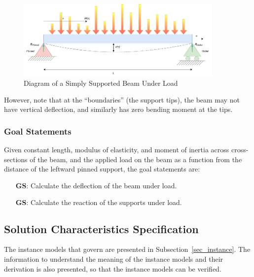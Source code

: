 \documentclass[12pt]{article}
\newcounter{goalnum} %
\begin{document}
\begin{figure}[H]
    \begin{center}
        \includegraphics[width=0.9\textwidth]{temp/beam_bending_diagram_annotated.drawio.png}
        \caption{\label{beam_bending_diagram_annotated} Diagram of a Simply Supported Beam Under Load}
    \end{center}
\end{figure}

However, note that at the ``boundaries'' (the support tips), the beam may not
have vertical deflection, and similarly has zero bending moment at the tips.

\subsubsection{Goal Statements}
\label{sssec_goals}

\noindent{}Given constant length, modulus of elasticity, and moment of inertia
across cross-sections of the beam, and the applied load on the beam as a
function from the distance of the leftward pinned support, the goal statements
are:

\begin{itemize}

    \item[\refstepcounter{goalnum}\textbf{GS\thegoalnum{}}\label{deflection}:]
        Calculate the deflection of the beam under load.

    \item[\refstepcounter{goalnum}\textbf{GS\thegoalnum{}}\label{reaction}:]
        Calculate the reaction of the supports under load.

\end{itemize}

\subsection{Solution Characteristics Specification}

The instance models that govern \progname{} are presented in
Subsection~\ref{sec_instance}.  The information to understand the meaning of the
instance models and their derivation is also presented, so that the instance
models can be verified.
\end{document}
